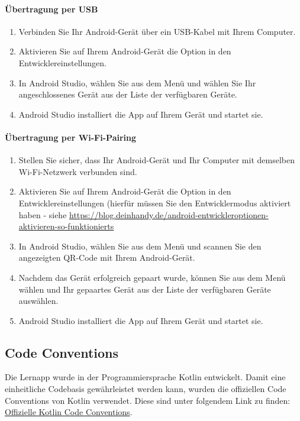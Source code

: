 \paragraph{Übertragung per USB}
\begin{enumerate}
    \item Verbinden Sie Ihr Android-Gerät über ein USB-Kabel mit Ihrem Computer.
    \item Aktivieren Sie auf Ihrem Android-Gerät die Option  in den Entwicklereinstellungen.
    \item In Android Studio, wählen Sie  aus dem  Menü und wählen Sie Ihr angeschlossenes Gerät aus der Liste der verfügbaren Geräte.
    \item Android Studio installiert die App auf Ihrem Gerät und startet sie.
\end{enumerate}

\paragraph{Übertragung per Wi-Fi-Pairing}
\begin{enumerate}
    \item Stellen Sie sicher, dass Ihr Android-Gerät und Ihr Computer mit demselben Wi-Fi-Netzwerk verbunden sind.
    \item Aktivieren Sie auf Ihrem Android-Gerät die Option  in den Entwicklereinstellungen (hierfür müssen Sie den Entwicklermodus aktiviert haben - siehe \href{https://blog.deinhandy.de/android-entwickleroptionen-aktivieren-so-funktionierts}{https://blog.deinhandy.de/android-entwickleroptionen-aktivieren-so-funktionierts}
    \item In Android Studio, wählen Sie  aus dem  Menü und scannen Sie den angezeigten QR-Code mit Ihrem Android-Gerät.
    \item Nachdem das Gerät erfolgreich gepaart wurde, können Sie  aus dem  Menü wählen und Ihr gepaartes Gerät aus der Liste der verfügbaren Geräte auswählen.
    \item Android Studio installiert die App auf Ihrem Gerät und startet sie.
\end{enumerate}

\subsection{Code Conventions}
Die Lernapp  wurde in der Programmiersprache Kotlin entwickelt. Damit eine einheitliche Codebasis gewährleistet werden kann, wurden die offiziellen Code Conventions von Kotlin verwendet. Diese sind unter folgendem Link zu finden: \href{https://kotlinlang.org/docs/coding-conventions.html}{Offizielle Kotlin Code Conventions}.\newline

